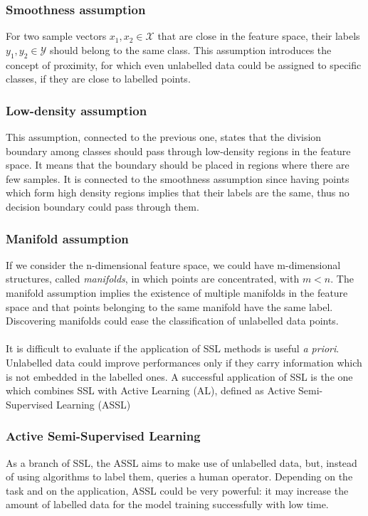 \documentclass[../main.tex]{subfiles}
\begin{document}
\subsubsection{Smoothness assumption}

For two sample vectors $x_{1}, x_{2} \in \mathcal{X}$ that are close in the feature space, their labels  $y_{1}, y_{2} \in \mathcal{Y}$ should belong to the same class. 
This assumption introduces the concept of proximity, for which even unlabelled data could be assigned to specific classes, if they are close to labelled points.

\subsubsection{Low-density assumption}

This assumption, connected to the previous one, states that the division boundary among classes should pass through low-density regions in the feature space. 
It means that the boundary should be placed in regions where there are few samples.
It is connected to the smoothness assumption since having points which form high density regions implies that their labels are the same, thus no decision boundary could pass through them.

\subsubsection{Manifold assumption}

If we consider the n-dimensional feature space, we could have m-dimensional structures, called \textit{manifolds}, in which points are concentrated, with $m<n$.
The manifold assumption implies the existence of multiple manifolds in the feature space and that points belonging to the same manifold have the same label.
Discovering manifolds could ease the classification of unlabelled data points.\\
\\
It is difficult to evaluate if the application of SSL methods is useful \textit{a priori}. Unlabelled data could improve performances only if they carry information which is not embedded in the labelled ones.
A successful application of SSL is the one which combines SSL with Active Learning (AL), defined as Active Semi-Supervised Learning (ASSL)
\subsubsection{Active Semi-Supervised Learning}

As a branch of SSL, the ASSL aims to make use of unlabelled data, but, instead of using algorithms to label them, queries a human operator. Depending on the task and on the application, ASSL could be very powerful: it may increase the amount of labelled data for the model training successfully with low time.
\end{document}
